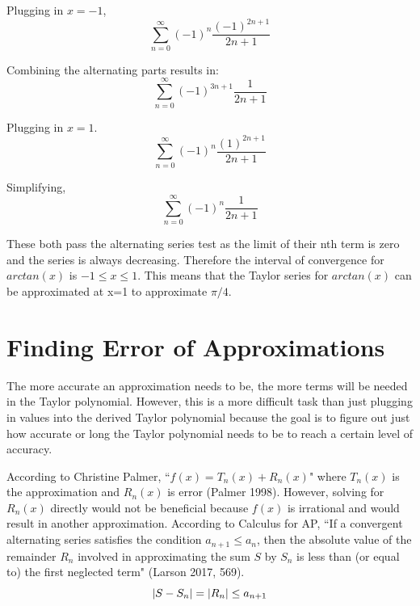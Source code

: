 \documentclass[12pt, titlepage]{article}
\begin{document}
Plugging in \(x = -1\),
\begin{equation*}
    \sum_{n=0}^{\infty} (-1)^{n} \frac{(-1)^{2n+1}}{2n+1}
\end{equation*}

Combining the alternating parts results in:
\begin{equation*}
    \sum_{n=0}^{\infty} (-1)^{3n+1} \frac{1}{2n+1}
\end{equation*}

Plugging in \(x = 1\).
\begin{equation*}
    \sum_{n=0}^{\infty} (-1)^{n} \frac{(1)^{2n+1}}{2n+1}
\end{equation*}

Simplifying,
\begin{equation*}
    \sum_{n=0}^{\infty} (-1)^{n} \frac{1}{2n+1}
\end{equation*}

These both pass the alternating series test as the limit of their nth term is zero and the series is always decreasing. Therefore the interval of convergence for \(arctan(x)\) is \( -1 \leq x \leq 1 \). This means that the Taylor series for \(arctan(x)\) can be approximated at x=1 to approximate \(\pi/4\).

\section{Finding Error of Approximations}
The more accurate an approximation needs to be, the more terms will be needed in the Taylor polynomial. However, this is a more difficult task than just plugging in values into the derived Taylor polynomial because the goal is to figure out just how accurate or long the Taylor polynomial needs to be to reach a certain level of accuracy.

According to Christine Palmer, ``\(f(x) = T_{n}(x) + R_{n}(x)\)" where \(T_{n}(x)\) is the approximation and \(R_{n}(x)\) is error (Palmer 1998). However, solving for \(R_{n}(x)\) directly would not be beneficial because \(f(x)\) is irrational and would result in another approximation.
According to Calculus for AP, ``If a convergent alternating series satisfies the condition \(a_{n+1} \leq a_{n} \), then the absolute value of the remainder \(R_{n}\) involved in approximating the sum \(S\) by \(S_{n}\) is less than (or equal to) the first neglected term" (Larson 2017, 569).
\begin{equation*}
  \abs{S - S_{n}} = \abs{R_{n}} \leq a_{n + 1}
\end{equation*}
\end{document}
